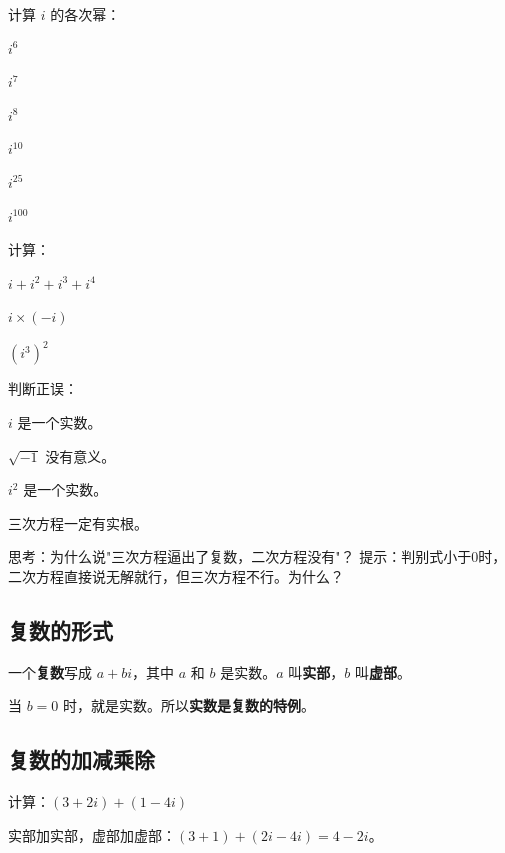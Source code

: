 \begin{exercise}
\item 计算 $i$ 的各次幂：
  \begin{subexercise}
    \item $i^6$
    \item $i^7$
    \item $i^8$
    \item $i^{10}$
    \item $i^{25}$
    \item $i^{100}$
  \end{subexercise}

\item 计算：
  \begin{subexercise}
    \item $i + i^2 + i^3 + i^4$
    \item $i \times (-i)$
    \item $(i^3)^2$
  \end{subexercise}

\item 判断正误：
  \begin{subexercise}
    \item $i$ 是一个实数。
    \item $\sqrt{-1}$ 没有意义。
    \item $i^2$ 是一个实数。
    \item 三次方程一定有实根。
  \end{subexercise}

\item 思考：为什么说"三次方程逼出了复数，二次方程没有"？
  提示：判别式小于0时，二次方程直接说无解就行，但三次方程不行。为什么？
\end{exercise}


\subsection*{复数的形式}

一个\textbf{复数}写成 $a + bi$，其中 $a$ 和 $b$ 是实数。$a$ 叫\textbf{实部}，$b$ 叫\textbf{虚部}。

当 $b=0$ 时，就是实数。所以\textbf{实数是复数的特例}。

\subsection*{复数的加减乘除}

\begin{example}
计算：$(3+2i)+(1-4i)$
\end{example}
\begin{solution}
实部加实部，虚部加虚部：$(3+1)+(2i-4i) = 4-2i$。
\end{solution}

